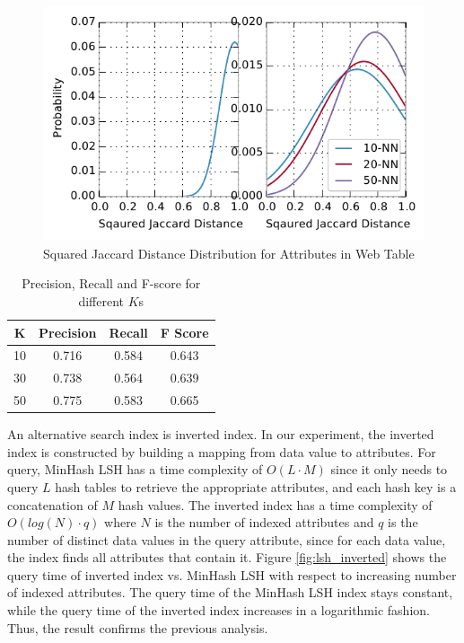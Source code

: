 \documentclass{sig-alternate}
\begin{document}
\begin{figure}[t]
\includegraphics[width=\columnwidth, natwidth=1, natheight=1]{dist_dist.pdf}
\caption{Squared Jaccard Distance Distribution for Attributes in Web Table}
\label{fig:jsim}
\end{figure}

\begin{table}
\begin{tabular}{|c|c|c|c|} \hline
K&Precision&Recall&F Score\\ \hline
10&0.716&0.584&0.643\\\hline
30&0.738&0.564&0.639\\\hline
50&0.775&0.583&0.665\\\hline

\end{tabular}
\centering
\caption{Precision, Recall and F-score for different $K$s}
\label{table:rfp}
\end{table}


An alternative search index is inverted index. In our experiment, the inverted index is constructed by building a mapping from data value to attributes. For query, MinHash LSH has a time complexity of $O(L\cdot M)$ since it only needs to query $L$ hash tables to retrieve the appropriate attributes, and each hash key is a concatenation of $M$ hash values. The inverted index has a time complexity of $O(log(N)\cdot q)$ where $N$ is the number of indexed attributes and $q$ is the number of distinct data values in the query attribute,
since for each data value, the index finds all attributes that contain it.
Figure \ref{fig:lsh_inverted} shows the query time of inverted index vs. MinHash LSH with respect to increasing number of indexed attributes. The query time of the MinHash LSH index stays constant, while the query time of the inverted index increases in a logarithmic fashion. Thus, the result confirms the previous analysis.
\end{document}
